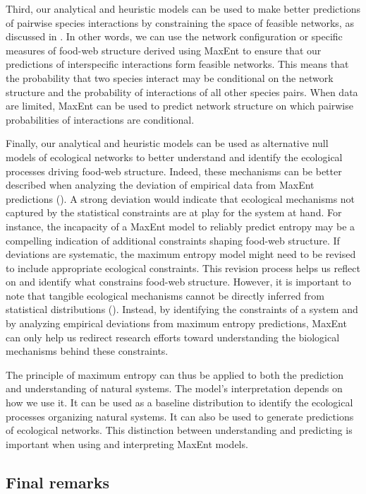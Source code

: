 Third, our analytical and heuristic models can be used to make better
predictions of pairwise species interactions by constraining the space of
feasible networks, as discussed in \textcite{Strydom2021Roadmapa}. In other words, we
can use the network configuration or specific measures of food-web structure
derived using MaxEnt to ensure that our predictions of interspecific
interactions form feasible networks. This means that the probability that two
species interact may be conditional on the network structure and the probability
of interactions of all other species pairs. When data are limited, MaxEnt can be
used to predict network structure on which pairwise probabilities of
interactions are conditional.

Finally, our analytical and heuristic models can be used as alternative null
models of ecological networks to better understand and identify the ecological
processes driving food-web structure. Indeed, these mechanisms can be better
described when analyzing the deviation of empirical data from MaxEnt predictions
(\cite{Caruso2022Fluctuating}). A strong deviation would indicate that ecological
mechanisms not captured by the statistical constraints are at play for the
system at hand. For instance, the incapacity of a MaxEnt model to reliably
predict entropy may be a compelling indication of additional constraints shaping
food-web structure. If deviations are systematic, the maximum entropy model
might need to be revised to include appropriate ecological constraints. This
revision process helps us reflect on and identify what constrains food-web
structure. However, it is important to note that tangible ecological mechanisms
cannot be directly inferred from statistical distributions
(\cite{WarrenII2022Seeing}). Instead, by identifying the constraints of a
system and by analyzing empirical deviations from maximum entropy predictions,
MaxEnt can only help us redirect research efforts toward understanding the
biological mechanisms behind these constraints. 

The principle of maximum entropy can thus be applied to both the prediction and
understanding of natural systems. The model's interpretation depends on how we
use it. It can be used as a baseline distribution to identify the ecological
processes organizing natural systems. It can also be used to generate
predictions of ecological networks. This distinction between understanding and
predicting is important when using and interpreting MaxEnt models. 

\subsection{Final remarks}

